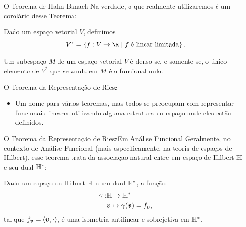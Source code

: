 \documentclass[13pt]{beamer}
\begin{document}
\begin{frame}{O Teorema de Hahn-Banach}
    Na verdade, o que realmente utilizaremos é um corolário desse Teorema:
    \begin{defn*}
        Dado um espaço vetorial \( V \), definimos
        \begin{equation*}
            V^{ * } = \left\{ f : V \to \R \mid f \text{ é linear limitada} \right\}
        .\end{equation*}
    \end{defn*}
    \begin{cor*}
        Um subespaço \( M \) de um espaço vetorial \( V \) é denso se, e somente se, o único elemento de \( V^{ * } \) que se anula em \( M \) é o funcional nulo.
    \end{cor*}
\end{frame}


\begin{frame}{O Teorema da Representação de Riesz}
    \begin{itemize}
        \item Um nome para vários teoremas, mas todos se preocupam com representar funcionais lineares utilizando alguma estrutura do espaço onde eles estão definidos.
    \end{itemize}
\end{frame}

\begin{frame}{O Teorema da Representação de Riesz}{Em Análise Funcional}
    Geralmente, no contexto de Análise Funcional (mais especificamente, na teoria de espaços de Hilbert), esse teorema trata da associação natural entre um espaço de Hilbert \( \mathbb{H} \) e seu dual \( \mathbb{H}^{ * } \):
    \begin{teo*}
        Dado um espaço de Hilbert \( \mathbb{H} \) e seu dual \( \mathbb{H}^{ * } \), a função
        \begin{align*}
            \gamma : &\mathbb{H} \to \mathbb{H}^{ * } \\
                     &\bm{v} \mapsto \gamma ( \bm{v} ) = f_{ \bm{v} }
        ,\end{align*}
        tal que \( f_{ \bm{v} } = \langle\bm{v}, \cdot\rangle \), é uma isometria antilinear e sobrejetiva em \( \mathbb{H}^{ * } \).
    \end{teo*}
\end{frame}
\end{document}
